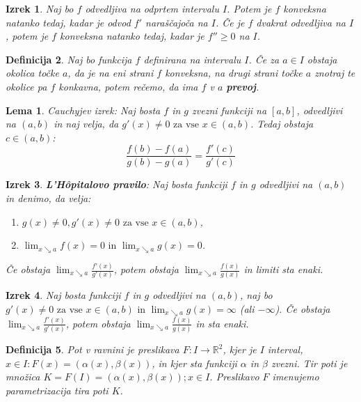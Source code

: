 \documentclass[a4paper,12pt]{report}
\newtheorem{izrek}{Izrek}[section]
\newtheorem{lema}{Lema}
\newtheorem{definicija}[izrek]{Definicija}
\begin{document}
\begin{izrek}
    Naj bo $f$ odvedljiva na odprtem intervalu $I$. Potem je $f$ konveksna natanko tedaj, 
    kadar je odvod $f'$ naraščajoča na $I$. Če je $f$ dvakrat odvedljiva na $I$, potem je $f$ konveksna natanko tedaj, 
    kadar je $f'' \geq 0$ na $I$.
\end{izrek}

\begin{definicija}
    Naj bo funkcija $f$ definirana na intervalu $I$. Če za $a \in I$ obstaja okolica točke $a$, da je na eni strani $f$ 
    konveksna, na drugi strani točke $a$ znotraj te okolice pa $f$ konkavna, potem rečemo, da ima $f$ v $a$ \textbf{prevoj}. 
\end{definicija}

\begin{lema}
    Cauchyjev izrek: Naj bosta $f$ in $g$ zvezni funkciji na $[a,b]$, odvedljivi na $(a,b)$ in naj velja, da  
    $g'(x) \neq 0 \text{ za vse } x \in (a,b)$. Tedaj obstaja $c \in  (a,b)$: $$\frac{f(b)-f(a)}{g(b)-g(a)} = \frac{f'(c)}{g'(c)}$$
\end{lema}

\begin{izrek}
    \textbf{L'Hôpitalovo pravilo}: Naj bosta funkciji $f$ in $g$ odvedljivi na $(a,b)$ in denimo, da velja:
    \begin{enumerate}
        \item $g(x) \neq 0, g'(x) \neq 0 \text{ za vse } x \in (a,b)$,
        \item $\lim_{x \searrow a} f(x) = 0 \text{ in } \lim_{x \searrow a} g(x) = 0$.
    \end{enumerate} 
    Če obstaja $\lim_{x \searrow a} \frac{f'(x)}{g'(x)}$, potem obstaja $\lim_{x \searrow a} \frac{f(x)}{g(x)}$ in limiti sta enaki.
\end{izrek}

\begin{izrek}
    Naj bosta funkciji $f$ in $g$ odvedljivi na $(a,b)$, naj bo $g'(x) \neq 0 \text{ za vse } x \in (a,b) \text{ in } \lim_{x \searrow a} g(x) = \infty$ (ali $- \infty$). 
    Če obstaja $\lim_{x \searrow a} \frac{f'(x)}{g'(x)}$, potem obstaja $\lim_{x \searrow a} \frac{f(x)}{g(x)}$ in sta enaki.
\end{izrek}

\begin{definicija}
    Pot v ravnini je preslikava $F: I \to \mathbb{R}^2$, kjer je $I$ interval, $x \in I: F(x) = (\alpha(x), \beta(x))$, in kjer sta funkciji $\alpha$ in $\beta$ 
    zvezni. Tir poti je množica $K = F(I) = {(\alpha(x), \beta(x)); x \in I}$. Preslikavo $F$ imenujemo parametrizacija tira poti $K$.
\end{definicija}
\end{document}
